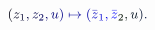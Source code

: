 \documentclass[12pt]{article}
\begin{document}
\makeatletter
\renewcommand*{\@textcolor}[3]{%
  \protect\leavevmode
  \begingroup
    \color#1{#2}#3%
  \endgroup
}
\makeatother
\begin{displaymath}
\mathcolor[RGB]{0,0,15}{(} \mathcolor[RGB]{0,0,30}{z} _ { \mathcolor[RGB]{0,0,45}{1} } \mathcolor[RGB]{0,0,60}{,} \mathcolor[RGB]{0,0,75}{z} _ { \mathcolor[RGB]{0,0,90}{2} } \mathcolor[RGB]{0,0,105}{,} \mathcolor[RGB]{0,0,120}{u} \mathcolor[RGB]{0,0,135}{)} \mathcolor[RGB]{0,0,150}{\mapsto} \mathcolor[RGB]{0,0,165}{(} {\mathcolor[RGB]{0,0,180}{\bar { \mathcolor[RGB]{0,0,195}{z} } }} _ { \mathcolor[RGB]{0,0,210}{1} } \mathcolor[RGB]{0,0,225}{,} {\mathcolor[RGB]{0,0,240}{\bar { \mathcolor[RGB]{0,0,255}{z} } }} _ { \mathcolor[RGB]{0,15,0}{2} } \mathcolor[RGB]{0,15,15}{,} \mathcolor[RGB]{0,15,30}{u} \mathcolor[RGB]{0,15,45}{)} \mathcolor[RGB]{0,15,60}{.}
\end{displaymath}
\end{document}

